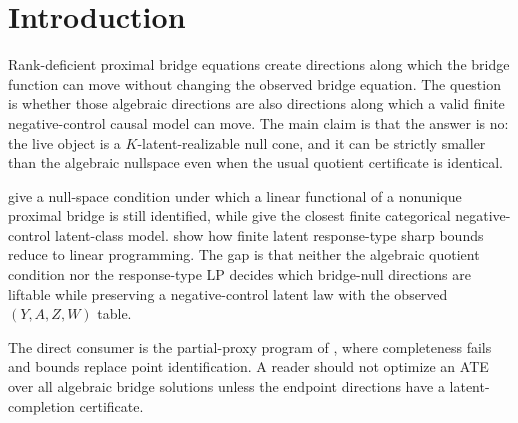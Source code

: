 \documentclass[11pt]{article}
\theoremstyle{definition}
\theoremstyle{plain}
\theoremstyle{remark}
\begin{document}
\section{Introduction}
Rank-deficient proximal bridge equations create directions along which the bridge function can move without changing the observed bridge equation. The question is whether those algebraic directions are also directions along which a valid finite negative-control causal model can move. The main claim is that the answer is no: the live object is a \(K\)-latent-realizable null cone, and it can be strictly smaller than the algebraic nullspace even when the usual quotient certificate is identical.

\citet[Theorem 3.3 and Corollary 4.1]{ZhangLiMiaoTchetgen2023} give a null-space condition under which a linear functional of a nonunique proximal bridge is still identified, while \citet[Section 3]{ShiMiaoNelsonTchetgen2020} give the closest finite categorical negative-control latent-class model. \citet[Section 3]{BalkePearl1997} show how finite latent response-type sharp bounds reduce to linear programming. The gap is that neither the algebraic quotient condition nor the response-type LP decides which bridge-null directions are liftable while preserving a negative-control latent law with the observed \((Y,A,Z,W)\) table.

The direct consumer is the partial-proxy program of \citet{GhassamiShpitserTchetgen2024}, where completeness fails and bounds replace point identification. A reader should not optimize an ATE over all algebraic bridge solutions unless the endpoint directions have a latent-completion certificate.
\end{document}
